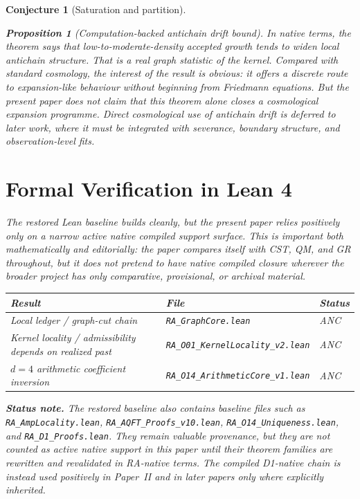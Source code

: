 \documentclass[11pt]{article}
\newtheorem{proposition}{Proposition}
\newtheorem{conjecture}{Conjecture}
\begin{document}
\begin{conjecture}[Saturation and partition]
\begin{proposition}[Computation-backed antichain drift bound]
In native terms, the theorem says that low-to-moderate-density accepted growth tends to widen local antichain structure. That is a real graph statistic of the kernel. Compared with standard cosmology, the interest of the result is obvious: it offers a discrete route to expansion-like behaviour without beginning from Friedmann equations. But the present paper does \emph{not} claim that this theorem alone closes a cosmological expansion programme. Direct cosmological use of antichain drift is deferred to later work, where it must be integrated with severance, boundary structure, and observation-level fits.

\section{Formal Verification in Lean 4}
\label{sec:lean}

The restored Lean baseline builds cleanly, but the present paper relies positively only on a narrow active native compiled support surface. This is important both mathematically and editorially: the paper compares itself with CST, QM, and GR throughout, but it does not pretend to have native compiled closure wherever the broader project has only comparative, provisional, or archival material.

\begin{center}
\begin{tabular}{lll}
\toprule
Result & File & Status \\
\midrule
Local ledger / graph-cut chain & \texttt{RA\_GraphCore.lean} & ANC \\
Kernel locality / admissibility depends on realized past & \texttt{RA\_O01\_KernelLocality\_v2.lean} & ANC \\
$d=4$ arithmetic coefficient inversion & \texttt{RA\_O14\_ArithmeticCore\_v1.lean} & ANC \\
\bottomrule
\end{tabular}
\end{center}

\noindent\textbf{Status note.} The restored baseline also contains baseline files such as \texttt{RA\_AmpLocality.lean}, \texttt{RA\_AQFT\_Proofs\_v10.lean}, \texttt{RA\_O14\_Uniqueness.lean}, and \texttt{RA\_D1\_Proofs.lean}. They remain valuable provenance, but they are not counted as active native support in this paper until their theorem families are rewritten and revalidated in RA-native terms. The compiled D1-native chain is instead used positively in Paper~II and in later papers only where explicitly inherited.


\end{proposition}
\end{conjecture}
\end{document}
